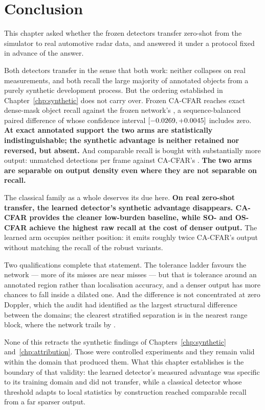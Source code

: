 \section{Conclusion}

This chapter asked whether the frozen detectors transfer zero-shot from the simulator to real
automotive radar data, and answered it under a protocol fixed in advance of the answer.

Both detectors transfer in the sense that both work: neither collapses on real measurements, and
both recall the large majority of annotated objects from a purely synthetic development process. But
the ordering established in Chapter~\ref{chp:synthetic} does not carry over. Frozen CA-CFAR reaches
\RoneCFARCA{} exact dense-mask object recall against the frozen network's \RoneTinyCNN{}, a
sequence-balanced paired difference of \RoneDelta{} whose confidence interval
$[-0.0269, +0.0045]$ includes zero. \textbf{At exact annotated support the two arms are
statistically indistinguishable; the synthetic advantage is neither retained nor reversed, but
absent.} And comparable recall is bought with substantially more output: \RoneBurdenTinyCNN{}
unmatched detections per frame against CA-CFAR's \RoneBurdenCFARCA{}. \textbf{The two arms are
separable on output density even where they are not separable on recall.}

The classical family as a whole deserves its due here. \textbf{On real zero-shot transfer, the
learned detector's synthetic advantage disappears. CA-CFAR provides the cleaner low-burden baseline,
while SO- and OS-CFAR achieve the highest raw recall at the cost of denser output.} The learned arm
occupies neither position: it emits roughly twice CA-CFAR's output without matching the recall of
the robust variants.

Two qualifications complete that statement. The tolerance ladder favours the network --- more of its
misses are near misses --- but that is tolerance around an annotated region rather than localisation
accuracy, and a denser output has more chances to fall inside a dilated one. And the difference is
not concentrated at zero Doppler, which the audit had identified as the largest structural
difference between the domains; the clearest stratified separation is in the nearest range block,
where the network trails by \RoneRangeADiff{}.

None of this retracts the synthetic findings of Chapters~\ref{chp:synthetic}
and~\ref{chp:attribution}. Those were controlled experiments and they remain valid within the domain
that produced them. What this chapter establishes is the boundary of that validity: the learned
detector's measured advantage was specific to its training domain and did not transfer, while a
classical detector whose threshold adapts to local statistics by construction reached comparable
recall from a far sparser output.

